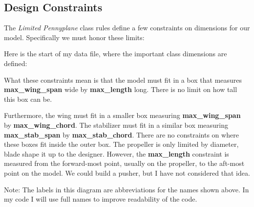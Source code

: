 \subsection{Design Constraints}

The {\it Limited Pennyplane} class rules define a few constraints on dimensions
for our model. Specifically we must honor these limits:

Here is the start of my data file, where the important class dimensions are
defined:


What these constraints mean is that the model must fit in a box that measures {\bf
max\_wing\_span} wide by {\bf max\_length} long. There is no limit on how
tall this box can be.

Furthermore, the wing must fit in a smaller box measuring {\bf max\_wing\_span}
by {\bf max\_wing\_chord}. The stabilizer must fit in a similar box measuring
{\bf max\_stab\_span} by {\bf max\_stab\_chord}. There are no constraints on where
these boxes fit inside the outer box. The propeller is only limited by
diameter, blade shape it up to the designer. However, the {\bf max\_length}
constraint is measured from the forward-most point, usually on the propeller,
to the aft-most point on the model. We could build a pusher, but I have not
considered that idea.


Note: The labels in this diagram are abbreviations for the names shown above.
In my code I will use full names to improve readability of the code.
